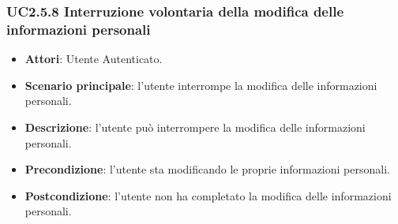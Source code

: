 \subsubsection{UC2.5.8 Interruzione volontaria della modifica delle informazioni personali}
\begin{itemize}
\item \textbf{Attori}: Utente Autenticato.
\item \textbf{Scenario principale}: l'utente interrompe la modifica delle informazioni personali.
\item \textbf{Descrizione}: l'utente può interrompere la modifica delle informazioni personali.
\item \textbf{Precondizione}: l'utente sta modificando le proprie informazioni personali.
\item \textbf{Postcondizione}: l'utente non ha completato la modifica delle informazioni personali.
\end{itemize}
